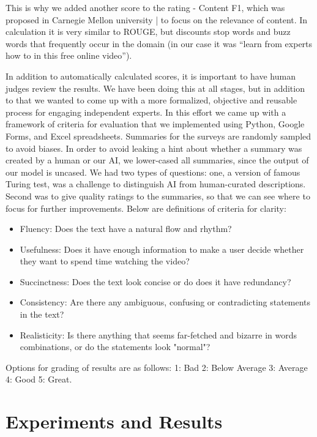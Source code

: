 \documentclass{article}
\begin{document}
This is why we added another score to the rating -  Content F1, which was proposed in Carnegie Mellon university | to focus on the relevance of content. In calculation it is very similar to ROUGE, but discounts stop words and buzz words that frequently occur in the domain (in our case it was “learn from experts how to in this free online video”).  

In addition to automatically calculated scores, it is important to have human judges review the results. We have been doing this at all stages, but in addition to that we wanted to come up with a more formalized, objective and reusable process for engaging independent experts. In this effort we came up with a framework of criteria for evaluation that we implemented using Python, Google Forms, and Excel spreadsheets. Summaries for the surveys are randomly sampled to avoid biases.  In order to avoid leaking a hint about whether a summary was created by a human or our AI, we lower-cased all summaries, since the output of our model is uncased. We had two types of questions: one, a version of famous Turing test, was a challenge to distinguish AI from human-curated descriptions. Second was to give quality ratings to the summaries, so that we can see where to focus for further improvements. Below are definitions of criteria for clarity:
\begin{itemize}

\item Fluency: Does the text have a natural flow and rhythm?
\item Usefulness: Does it have enough information to make a user decide whether they want to spend time watching the video?
\item Succinctness: Does the text look concise or do does it have redundancy?
\item Consistency: Are there any ambiguous, confusing or contradicting statements in the text?
\item Realisticity: Is there anything that seems far-fetched and bizarre in words combinations, or do the statements look "normal"?

\end{itemize}

Options for grading of results are as follows: 1: Bad   2: Below Average   3: Average   4: Good   5: Great.



\section{Experiments and Results}
\end{document}
